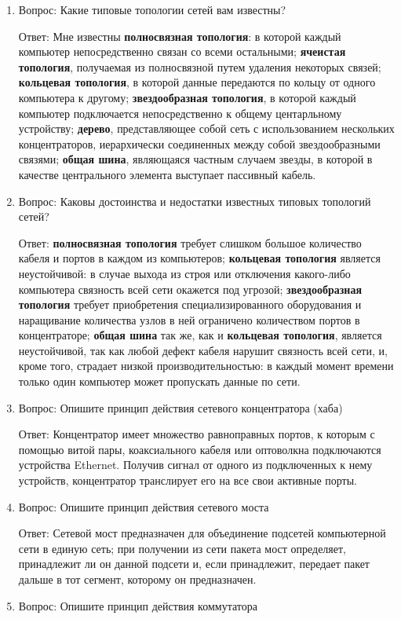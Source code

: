 \documentclass[14pt]{extarticle}
\begin{document}
\begin{enumerate}
    \item Вопрос: Какие типовые топологии сетей вам известны?

    Ответ: Мне известны \textbf{полносвязная топология}: в которой каждый компьютер непосредственно связан со всеми остальными; \textbf{ячеистая топология}, получаемая из полносвязной путем удаления некоторых связей; \textbf{кольцевая топология}, в которой данные передаются по кольцу от одного компьютера к другому; \textbf{звездообразная топология}, в которой каждый компьютер подключается непосредственно к общему центарльному устройству; \textbf{дерево}, представляющее собой сеть с использованием нескольких концентраторов, иерархически соединенных между собой звездообразными связями; \textbf{общая шина}, являющаяся частным случаем звезды, в которой в качестве центрального элемента выступает пассивный кабель.
    \item Вопрос: Каковы достоинства и недостатки известных типовых топологий сетей?

    Ответ: \textbf{полносвязная топология} требует слишком большое количество кабеля и портов в каждом из компьютеров; \textbf{кольцевая топология} является неустойчивой: в случае выхода из строя или отключения какого-либо компьютера связность всей сети окажется под угрозой; \textbf{звездообразная топология} требует приобретения специализированного оборудования и наращивание количества узлов в ней ограничено количеством портов в концентраторе; \textbf{общая шина} так же, как и \textbf{кольцевая топология}, является неустойчивой, так как любой дефект кабеля нарушит связность всей сети, и, кроме того, страдает низкой производительностью: в каждый момент времени только один компьютер может пропускать данные по сети.
    \item Вопрос: Опишите принцип действия сетевого концентратора (хаба)

    Ответ: Концентратор имеет множество равноправных портов, к которым с помощью витой пары, коаксиального кабеля или оптоволкна подключаются устройства Ethernet. Получив сигнал от одного из подключенных к нему устройств, концентратор транслирует его на все свои активные порты.
    \item Вопрос: Опишите принцип действия сетевого моста

    Ответ: Сетевой мост предназначен для объединение подсетей компьютерной сети в единую сеть; при получении из сети пакета мост определяет, принадлежит ли он данной подсети и, если принадлежит, передает пакет дальше в тот сегмент, которому он предназначен.
    \item Вопрос: Опишите принцип действия коммутатора


\end{enumerate}
\end{document}
